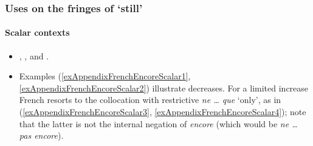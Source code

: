\subsubsection{Uses on the fringes of \lq{}still\rq{}}

\paragraph{Scalar contexts}
\label{appendixFrenchEncoreScalar}
\begin{itemize}
	\item \textcite{Fuchs1988}, \textcite[106–108]{MosegaardHansen2008}, \textcite{Vaelikangas1982} and \textcite[78]{VictorriFuchs1996}.
	\item Examples (\ref{exAppendixFrenchEncoreScalar1}, \ref{exAppendixFrenchEncoreScalar2}) illustrate decreases. For a limited increase French resorts to the collocation with restrictive \textit{ne … que} \lq only\rq{}, as in (\ref{exAppendixFrenchEncoreScalar3}, \ref{exAppendixFrenchEncoreScalar4}); note that the latter is not the internal negation of \textit{encore} (which would be \textit{ne … pas encore}).
\end{itemize}
\largerpage
